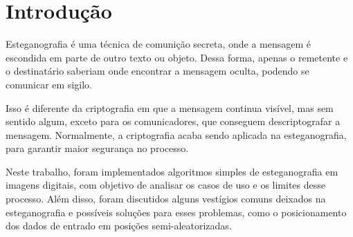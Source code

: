 \section{Introdução} \label{sec:introducao}

Esteganografia é uma técnica de comunição secreta, onde a mensagem é escondida em parte de outro texto ou objeto. Dessa forma, apenas o remetente e o destinatário saberiam onde encontrar a mensagem oculta, podendo se comunicar em sigilo.

Isso é diferente da criptografia em que a mensagem continua visível, mas sem sentido algum, exceto para os comunicadores, que conseguem descriptografar a mensagem. Normalmente, a criptografia acaba sendo aplicada na esteganografia, para garantir maior segurança no processo.

Neste trabalho, foram implementados algoritmos simples de esteganografia em imagens digitais, com objetivo de analisar os casos de uso e os limites desse processo. Além disso, foram discutidos alguns vestígios comuns deixados na esteganografia e possíveis soluções para esses problemas, como o posicionamento dos dados de entrado em posições semi-aleatorizadas.
